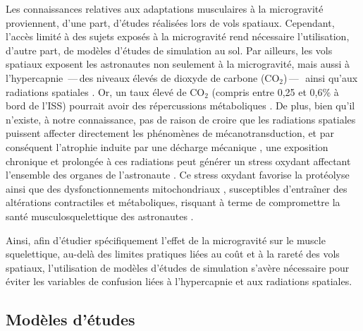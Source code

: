 \documentclass[11pt]{report}
\begin{document}
\medskip Les connaissances relatives aux adaptations musculaires à la microgravité proviennent, d'une part, d'études réalisées lors de vols spatiaux. Cependant, l'accès limité à des sujets exposés à la microgravité rend nécessaire l'utilisation, d'autre part, de modèles d'études de simulation au sol. Par ailleurs, les vols spatiaux exposent les astronautes non seulement à la microgravité, mais aussi à l'hypercapnie \,---\,des niveaux élevés de dioxyde de carbone (CO$_2$)\,---\,\-\ ainsi qu'aux radiations spatiales \parencite{Nascimento2025Oct}. Or, un taux élevé de CO$_2$ (compris entre 0,25 et 0,6\% à bord de l'ISS) pourrait avoir des répercussions métaboliques \parencite{Jaitovich2015Feb,Ceco2021Jan}. De plus, bien qu'il n'existe, à notre connaissance, pas de raison de croire que les radiations spatiales puissent affecter directement les phénomènes de mécanotransduction, et par conséquent l'atrophie induite par une décharge mécanique \parencite{Wiggs2023May}, une exposition chronique et prolongée à ces radiations peut générer un stress oxydant affectant l'ensemble des organes de l'astronaute \parencite{Pavlakou2018Oct}. Ce stress oxydant favorise la protéolyse \parencite{Zhang2023Aug} ainsi que des dysfonctionnements mitochondriaux \parencite{Nascimento2025Oct}, susceptibles d'entraîner des altérations contractiles et métaboliques, risquant à terme de compromettre la santé musculosquelettique des astronautes \parencite{Rudolf2024May}.

Ainsi, afin d'étudier spécifiquement l'effet de la microgravité sur le muscle squelettique, au-delà des limites pratiques liées au coût et à la rareté des vols spatiaux, l'utilisation de modèles d'études de simulation s'avère nécessaire pour éviter les variables de confusion liées à l'hypercapnie et aux radiations spatiales.

\subsection{Modèles d'études}
\end{document}
